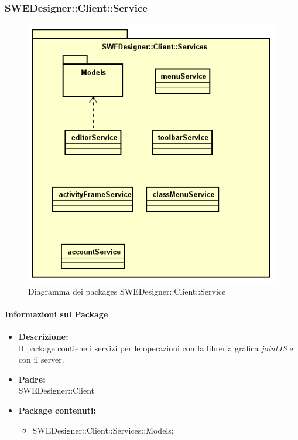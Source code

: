 \begin{itemize}
\subsubsection{SWEDesigner::Client::Service}
		 \begin{figure}[h!]
		\centering
		\includegraphics[scale=0.8]{Disegnetti/SWEDesigner__Client__Services.png}
		\caption{Diagramma dei packages SWEDesigner::Client::Service}
 		\end{figure}
		\paragraph{Informazioni sul Package}
		\begin{itemize}
			\item \textbf{Descrizione: }\\
			Il package contiene i servizi per le operazioni con la libreria grafica
			\emph{jointJS} e con il server.
			\item \textbf{Padre: }\\ SWEDesigner::Client
			\item \textbf{Package contenuti: }
			\begin{itemize}
				\item SWEDesigner::Client::Services::Models;
			\end{itemize}
		\end{itemize}

\end{itemize}
